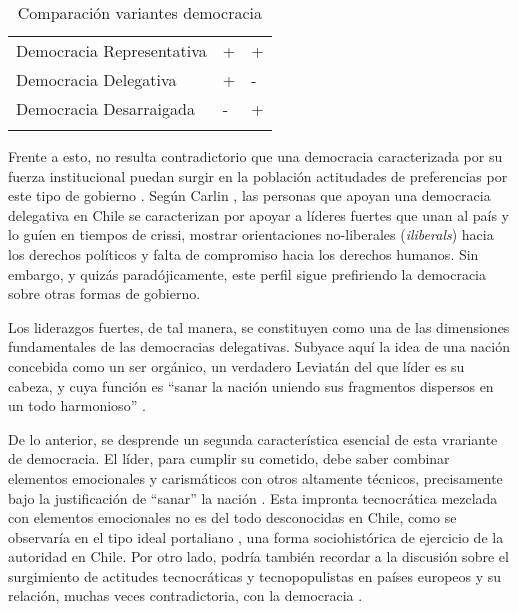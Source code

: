 \documentclass[12pt,twoside]{templates/facsothesis}
\begin{document}
\begin{table}

\caption{\label{tab:unnamed-chunk-2}Comparación variantes democracia}
\centering
\begin{tabu} to 
\toprule
{} &  & \\
\midrule
Democracia Representativa & + & +\\
Democracia Delegativa & + & -\\
Democracia Desarraigada & - & +\\
\bottomrule
{}\\
\end{tabu}
\end{table}

Frente a esto, no resulta contradictorio que una democracia caracterizada por su fuerza institucional puedan surgir en la población actitudades de preferencias por este tipo de gobierno \citep{carlin2011, carlin2018}. Según Carlin \citeyearpar{carlin2018}, las personas que apoyan una democracia delegativa en Chile se caracterizan por apoyar a líderes fuertes que unan al país y lo guíen en tiempos de crissi, mostrar orientaciones no-liberales (\emph{iliberals}) hacia los derechos políticos y falta de compromiso hacia los derechos humanos. Sin embargo, y quizás paradójicamente, este perfil sigue prefiriendo la democracia sobre otras formas de gobierno.

Los liderazgos fuertes, de tal manera, se constituyen como una de las dimensiones fundamentales de las democracias delegativas. Subyace aquí la idea de una nación concebida como un ser orgánico, un verdadero Leviatán del que líder es su cabeza, y cuya función es ``sanar la nación uniendo sus fragmentos dispersos en un todo harmonioso'' \citep[pp.60]{odonnell1994}.

De lo anterior, se desprende un segunda característica esencial de esta vrariante de democracia. El líder, para cumplir su cometido, debe saber combinar elementos emocionales y carismáticos con otros altamente técnicos, precisamente bajo la justificación de ``sanar'' la nación \citep{odonnell1994}. Esta impronta tecnocrática mezclada con elementos emocionales no es del todo desconocidas en Chile, como se observaría en el tipo ideal portaliano \citep{araujo2013}, una forma sociohistórica de ejercicio de la autoridad en Chile. Por otro lado, podría también recordar a la discusión sobre el surgimiento de actitudes tecnocráticas y tecnopopulistas en países europeos y su relación, muchas veces contradictoria, con la democracia \citep{chiru2022, ganuza2020, pilet2023}.
\end{document}

